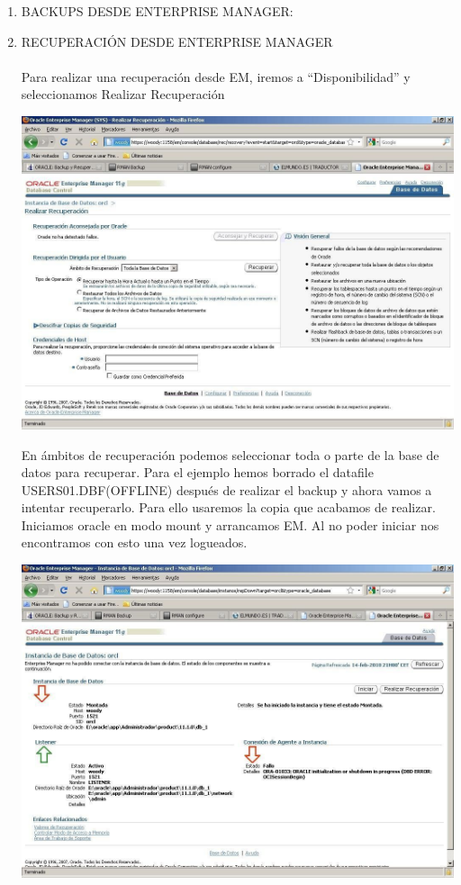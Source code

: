 \begin{enumerate}[1.]
	\item BACKUPS  DESDE  ENTERPRISE  MANAGER:
	

	\item RECUPERACIÓN  DESDE  ENTERPRISE  MANAGER
	\\\\Para realizar una recuperación desde EM, iremos a “Disponibilidad” y seleccionamos Realizar Recuperación
	\begin{center}
	\includegraphics[width=15cm]{./Imagenes/recu_1}  
	\end{center}	
	En ámbitos de recuperación podemos seleccionar toda o parte de la base de datos para recuperar.
Para  el  ejemplo  hemos  borrado  el  datafile  USERS01.DBF(OFFLINE)  después  de realizar el backup y ahora vamos a intentar recuperarlo. Para ello usaremos la copia que acabamos de realizar. Iniciamos oracle en modo mount y arrancamos EM. Al no poder iniciar nos encontramos con esto una vez logueados.
	\begin{center}
	\includegraphics[width=15cm]{./Imagenes/recu_2}  

\end{center}
\end{enumerate}
